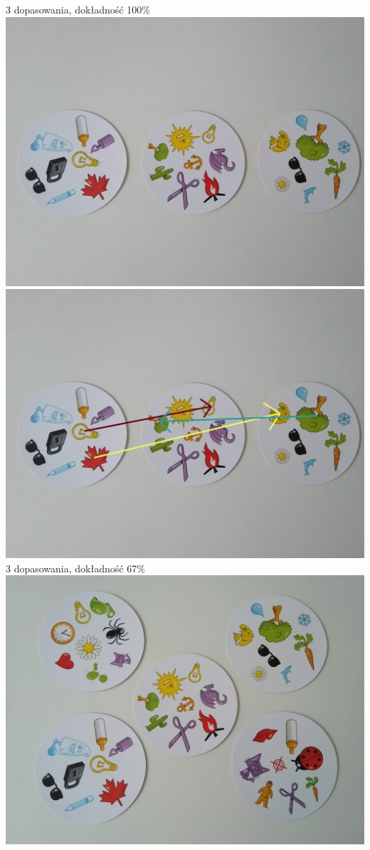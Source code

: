 \documentclass[10pt,a4paper]{article}
\begin{document}
\begin{center}
3 dopasowania, dokładność 100\%
\includegraphics[scale=0.28]{hard/dobble13.jpg}
\includegraphics[scale=0.28]{hard/img_arrows13.jpg}\\
3 dopasowania, dokładność 67\%
\includegraphics[scale=0.28]{hard/dobble14.jpg}

\end{center}
\end{document}
